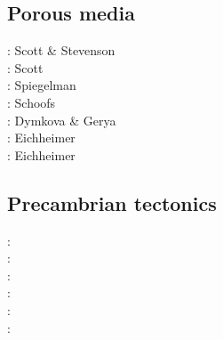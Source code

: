 \subsection{Porous media} 

\begin{scriptsize}
\nineteeneightysix: Scott \& Stevenson \cite{scst86}\\
\nineteeneightyeight: Scott \cite{scot88}\\
\nineteenninetythree: Spiegelman \cite{spie93}\\
\twothousand: Schoofs \etal \cite{scth00b}\\
\twothousandthirteen: Dymkova \& Gerya \cite{dyge13}\\
\twothousandnineteen: Eichheimer \etal \cite{eitp19}\\
\twothousandtwenty: Eichheimer \etal \cite{eitf20}
\end{scriptsize}

\subsection{Precambrian tectonics}

\begin{scriptsize}
\nineteenninetyfour: \cite{guto94}\\
\twothousandthree: \cite{wemv03}\\
\twothousandten: \cite{sigb10}\\
\twothousandeleven: \cite{pege11}\\
\twothousandfourteen: \cite{gery14}\cite{gagb14}\cite{sigb14}\\
\twothousandtwenty: \cite{poyd20}
\end{scriptsize}

